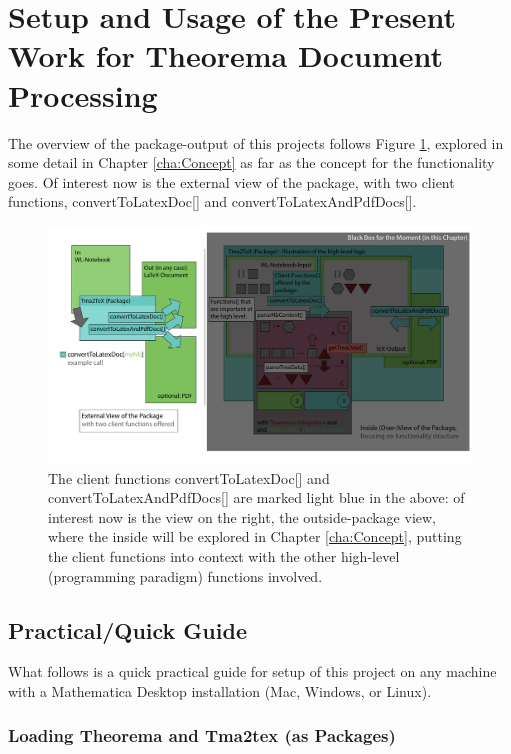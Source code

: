 \section{Setup and Usage of the Present Work for Theorema Document Processing} \label{usage}

The overview of the package-output of this projects follows Figure \ref{fig:Tma2Tex-Logic-and-Package}, explored in some detail in Chapter \ref{cha:Concept} as far as the concept for the functionality goes. Of interest now is the external view of the package, with two client functions, convertToLatexDoc[] and convertToLatexAndPdfDocs[].

\begin{figure}[h]
    \centering
    \includegraphics[scale=0.3]{images/introduction/Tma2Tex-Logic-Xt-View-01.png}
    \caption{The client functions convertToLatexDoc[] and convertToLatexAndPdfDocs[] are marked light blue in the above: of interest now is the view on the right, the outside-package view, where the inside will be explored in Chapter \ref{cha:Concept}, putting the client functions into context with the other high-level (programming paradigm) functions involved.}
    \label{fig:Tma2Tex-Logic-and-Package}
\end{figure}

\subsection{Practical/Quick Guide}

What follows is a quick practical guide for setup of this project on any machine with a Mathematica Desktop installation (Mac, Windows, or Linux). 

\subsubsection{Loading Theorema and Tma2tex (as Packages)}

